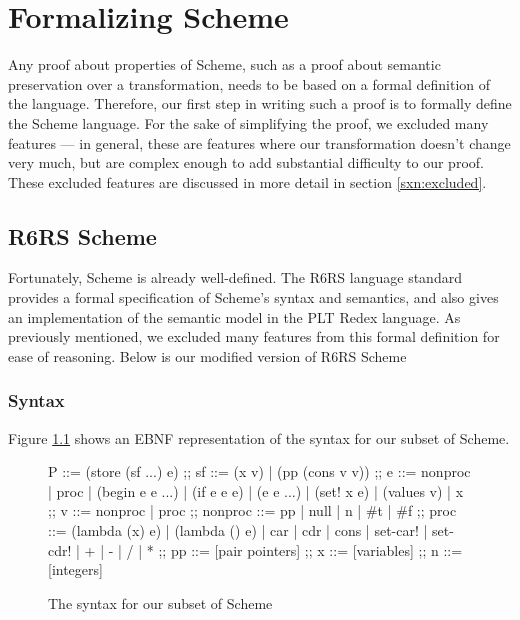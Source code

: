 \chapter{Formalizing Scheme}
Any proof about properties of Scheme, such as a proof about semantic preservation over a transformation, needs to be based on a formal definition of the language. Therefore, our first step in writing such a proof is to formally define the Scheme language. For the sake of simplifying the proof, we excluded many features --- in general, these are features where our transformation doesn't change very much, but are complex enough to add substantial difficulty to our proof. These excluded features are discussed in more detail in section \ref{sxn:excluded}.
\section{R6RS Scheme}
Fortunately, Scheme is already well-defined. The R6RS language standard \cite{sperber_revised6_2009} provides a formal specification of Scheme's syntax and semantics, and also gives an implementation of the semantic model in the PLT Redex language. As previously mentioned, we excluded many features from this formal definition for ease of reasoning. Below is our modified version of R6RS Scheme

\subsection{Syntax}
Figure \ref{fig:syntax} shows an EBNF representation of the syntax for our subset of Scheme.
\newpage
\begin{figure}[h]
    \centering
\begin{bnfgrammar}
    P ::=
        (store (sf ...) e)
    ;;
    sf ::=
        (x v)
    |   (pp (cons v v))
    ;;
    e ::=
        nonproc
    |   proc
    |   (begin e e ...)
    |   (if e e e)
    |   (e e ...)
    |   (set! x e)
    |   (values v)
    |   x
    ;;
    v ::=
        nonproc
    |   proc
    ;;
    nonproc ::=
        pp
    |   null
    |   n
    |   \#t
    |   \#f
    ;;
    proc ::=
        (lambda (x) e)
    |   (lambda () e)
    |   car
    |   cdr
    |   cons
    |   set-car!
    |   set-cdr!
    |   +   
    |   -
    |   /
    |   *
    ;;
    pp ::=
        [pair pointers]
    ;;
    x ::=
        [variables]
    ;;
    n ::=
        [integers]
\end{bnfgrammar}
\caption{The syntax for our subset of Scheme}
    \label{fig:syntax}
\end{figure}

